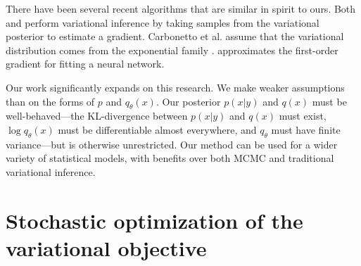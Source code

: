 



There have been several recent algorithms that are similar in spirit
to ours.  Both \cite{carbonetto:2009} and \cite{graves:2011} perform variational
inference by taking samples from the variational posterior to estimate
a gradient.  Carbonetto et
al. assume that the variational distribution comes from the
exponential family \citep{carbonetto:2009}.  \cite{graves:2011}
approximates the first-order gradient for fitting a neural network.



Our work significantly expands on this research.  We make weaker
assumptions than \cite{carbonetto:2009} on the forms
of $p$ and $q_\theta(x)$.  Our posterior $p(x | y)$ and $q(x)$ must be
well-behaved---the KL-divergence between $p(x | y)$ and $q(x)$ must
exist, $\log q_\theta(x)$ must be differentiable almost everywhere,
and $q_\theta$ must have finite variance---but is otherwise
unrestricted.  Our method can be used for a wider variety of
statistical models, with benefits over both MCMC and traditional
variational inference.





\section{Stochastic optimization of the variational objective}

